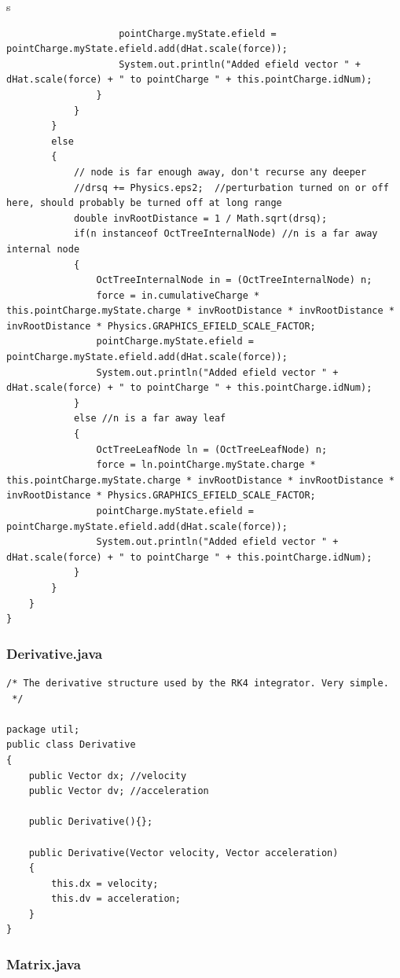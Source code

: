 s\documentclass[10pt]{article}
\begin{document}
\begin{verbatim}
					pointCharge.myState.efield = pointCharge.myState.efield.add(dHat.scale(force));
					System.out.println("Added efield vector " + dHat.scale(force) + " to pointCharge " + this.pointCharge.idNum);
				}
			}
		} 
		else 
		{ 
			// node is far enough away, don't recurse any deeper
			//drsq += Physics.eps2;  //perturbation turned on or off here, should probably be turned off at long range
			double invRootDistance = 1 / Math.sqrt(drsq);
			if(n instanceof OctTreeInternalNode) //n is a far away internal node
			{
				OctTreeInternalNode in = (OctTreeInternalNode) n;
				force = in.cumulativeCharge * this.pointCharge.myState.charge * invRootDistance * invRootDistance * invRootDistance * Physics.GRAPHICS_EFIELD_SCALE_FACTOR;
				pointCharge.myState.efield = pointCharge.myState.efield.add(dHat.scale(force));
				System.out.println("Added efield vector " + dHat.scale(force) + " to pointCharge " + this.pointCharge.idNum);
			}
			else //n is a far away leaf
			{
				OctTreeLeafNode ln = (OctTreeLeafNode) n;
				force = ln.pointCharge.myState.charge * this.pointCharge.myState.charge * invRootDistance * invRootDistance * invRootDistance * Physics.GRAPHICS_EFIELD_SCALE_FACTOR;
				pointCharge.myState.efield = pointCharge.myState.efield.add(dHat.scale(force));
				System.out.println("Added efield vector " + dHat.scale(force) + " to pointCharge " + this.pointCharge.idNum);
			}
		}
	}
}
\end{verbatim}


\subsubsection{Derivative.java}
\begin{verbatim}
/* The derivative structure used by the RK4 integrator. Very simple.
 */

package util;
public class Derivative
{
	public Vector dx; //velocity
	public Vector dv; //acceleration
	
	public Derivative(){};
	
	public Derivative(Vector velocity, Vector acceleration)
	{
		this.dx = velocity;
		this.dv = acceleration;
	}
}
\end{verbatim}

\subsubsection{Matrix.java}
\end{document}
